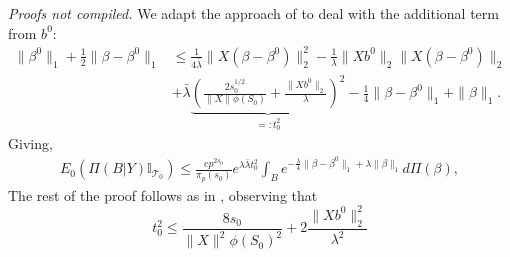 \documentclass[11pt]{article}
\renewenvironment{proof}[1]{\par\noindent{\bf #1 \ }}{\hfill\BlackBox\\[2mm]}
\renewenvironment{proof}[1]{\textit{Proofs not compiled.}}{}
\newcommand{\T}{\mathcal{T}}
\newcommand{\bezero}{\beta^0}
\numberwithin{equation}{section}
\begin{document}
\begin{proof}{Proof of Theorem \ref{thm:dimension_no_deconfounding}}
We adapt the approach of \cite{CS-HV2015} to deal with the additional term from $b^0$:
\begin{align*}
\|\beta^0\|_1 + \frac{1}{2}\|\beta - \bezero\|_1 
&\leq\frac{1}{4 \bar{\lambda}}\|X(\beta - \bezero)\|_2^2 - \frac{1}{\lambda}\|Xb^0\|_2\|X(\beta - \bezero)\|_2\\ &+  \bar{\lambda	} \underbrace{ \left(\frac{2s_0^{1/2}}{\|X\|\phi(S_0)}+ \frac{\|Xb^0\|_2}{\lambda} \right)^2}_{=: t_0^2} - \frac{1}{4}\|\beta - \bezero\|_1 + \|\beta\|_1.
\end{align*}
Giving,
\begin{align}
	E_0 \left(\Pi(B | Y) \mathbb{I}_{\T_0} \right) \leq \frac{ep^{2s_0}}{\pi_p(s_0)} e^{\lambda\bar{\lambda}t_0^2}\int_B 
	e^{-\frac{\lambda}{4}\|\beta - \beta^0\|_1 + \lambda\|\beta\|_1} d\Pi(\beta),
\end{align}
The rest of the proof follows as in \cite{CS-HV2015}, observing that 
$$t_0^2 \leq \frac{8s_0}{\|X\|^2\phi(S_0)^2} +  2\frac{\|Xb^0\|_2^2}{\lambda^2} 
$$	
\end{proof}
\end{document}

